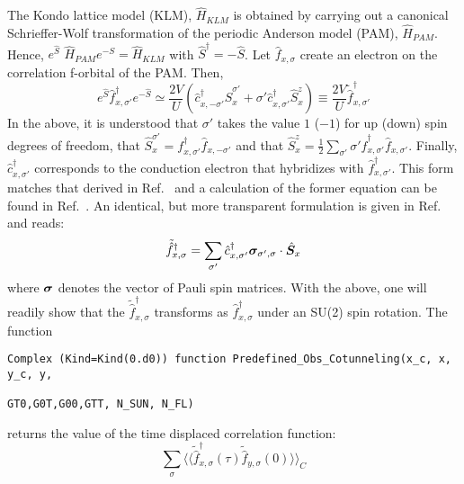 The  Kondo lattice model (KLM), $\hat{H}_{KLM}$   is obtained by carrying out a   canonical Schrieffer-Wolf  \cite{Schrieffer66}  transformation  of the   periodic Anderson model (PAM), $\hat{H}_{PAM}$.    Hence, $e^{\hat{S}}  $ $\hat{H}_{PAM} $$ e^{-S}   = \hat{H}_{KLM}$  with  $\hat{S}^\dagger = - \hat{S}$.     Let $\hat{f}_{x,\sigma} $  create an  electron on the   correlation f-orbital of the   PAM.  Then, 
\begin{equation}
	e^{\hat{S}} \hat{f}^{\dagger}_{x,\sigma'} e^{-\hat{S}}   \simeq  
     \frac{2V}{U}  \left( \hat{c}^{\dagger}_{x,-\sigma'}  \hat{S}^{\sigma'}_{x} +  \sigma'   \hat{c}^{\dagger}_{x,\sigma'} \hat{S}^{z}_x   \right)  \equiv  \frac{2V}{U}   \tilde{\hat{f}}^{\dagger}_{x,\sigma'}    
\end{equation}
In the above, it is understood that $\sigma'$ takes the value $1$ ($-1$)  for up  (down) spin degrees of freedom, that  $  \hat{S}^{\sigma'}_{x} =  f^{\dagger}_{x,\sigma'} \hat{f}^{}_{x,-\sigma'}  $  and that 
$ \hat{S}^{z}_{x} = \frac{1}{2} \sum_{\sigma'}  \sigma' \hat{f}^{\dagger}_{x,\sigma'} \hat{f}^{}_{x,\sigma'} $.  Finally, $\hat{c}^{\dagger}_{x,\sigma'}$ corresponds to the conduction electron that hybridizes with $\hat{f}^{\dagger}_{x,\sigma'}$.  This form matches that derived in Ref.~\cite{Costi00} and a  calculation  of the former equation can be found in Ref.~\cite{Raczkowski18}.  An identical, but more transparent formulation is given in  Ref.~\cite{Maltseva09}   and reads: 
\begin{equation}
 	\tilde{\hat{f}}^{\dagger}_{x,\sigma} = \sum_{\sigma'} \hat{c}^{\dagger}_{x,\sigma'} \boldsymbol{\sigma}_{\sigma',\sigma} \cdot  \hat{\boldsymbol{S}}_x
\end{equation}
where $\ve{\sigma}$  denotes  the vector of Pauli spin matrices.    With the above,  one will readily show that the  $ \tilde{\hat{f}}^{\dagger}_{x,\sigma} $  transforms as  $ \hat{f}^{\dagger}_{x,\sigma} $   under an SU(2)  spin rotation. 
The  function 
\begin{lstlisting}[style=fortran]
Complex (Kind=Kind(0.d0)) function Predefined_Obs_Cotunneling(x_c, x, y_c, y,  
                                                          GT0,G0T,G00,GTT, N_SUN, N_FL)
\end{lstlisting}
returns the   value of the time displaced correlation function: 
\begin{equation}
	\sum_{\sigma} \langle \langle   \tilde{\hat{f}}^{\dagger}_{x,\sigma}(\tau)  \tilde{\hat{f}}_{y,\sigma}(0)   \rangle \rangle_{C} 
\end{equation}
$$
